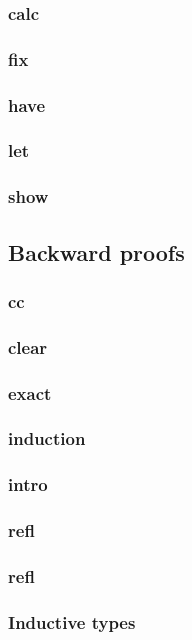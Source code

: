 \documentclass[a4paper,10pt,oneside]{report}%
\begin{document}
    \subsubsection{calc}
    \subsubsection{fix}
    \subsubsection{have}
    \subsubsection{let}
    \subsubsection{show}
\subsection{Backward proofs}
    \subsubsection{cc}
    \subsubsection{clear}
    \subsubsection{exact}
    \subsubsection{induction}
    \subsubsection{intro}
    \subsubsection{refl}
    \subsubsection{refl}
\subsubsection{Inductive types}
\end{document}
